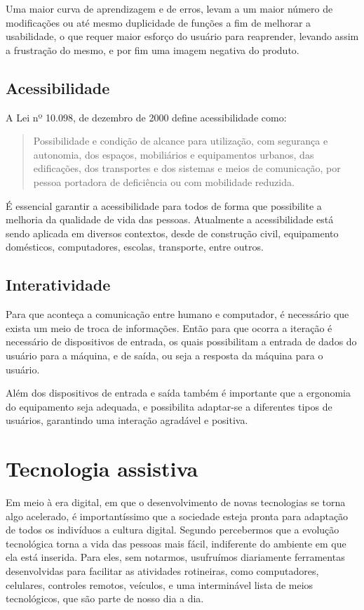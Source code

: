 \documentclass[
	12pt,			%
	openright,		%
	oneside,			%
	a4paper,			%
	chapter=TITLE,		%
	english,			%
	brazil,			%
	]{abntex2}
\begin{document}
Uma maior curva de aprendizagem e de erros, levam a um maior número de modificações ou até mesmo duplicidade de funções a fim de melhorar a usabilidade, o que requer maior esforço do usuário para reaprender, levando assim a frustração do mesmo, e por fim uma imagem negativa do produto.

\subsection{Acessibilidade}

A Lei nº 10.098, de dezembro de 2000 define acessibilidade como:

\begin{quote}\small\setlength{\leftskip}{4cm}
Possibilidade e condição de alcance para utilização, com segurança e autonomia, dos espaços, mobiliários e equipamentos urbanos, das edificações, dos transportes e dos sistemas e meios de comunicação, por pessoa portadora de deficiência ou com mobilidade reduzida.
\end{quote}

É essencial garantir a acessibilidade para todos de forma que possibilite a melhoria da qualidade de vida das pessoas. Atualmente a acessibilidade está sendo aplicada em diversos contextos, desde de construção civil, equipamento domésticos, computadores, escolas, transporte, entre outros.

\subsection{Interatividade}

Para que aconteça a comunicação entre humano e computador, é necessário que exista um meio de troca de informações. Então para que ocorra a iteração é necessário de dispositivos de entrada, os quais possibilitam a entrada de dados do usuário para a máquina, e de saída, ou seja a resposta da máquina para o usuário.

Além dos dispositivos de entrada e saída também é importante que a ergonomia do equipamento seja adequada, e possibilita adaptar-se a diferentes tipos de usuários, garantindo uma interação agradável e positiva.

\section{Tecnologia assistiva}

Em meio à era digital, em que o desenvolvimento de novas tecnologias se torna algo acelerado, é importantíssimo que a sociedade esteja pronta para adaptação de todos os indivíduos a cultura digital. Segundo  percebermos que a evolução tecnológica torna a vida das pessoas mais fácil, indiferente do ambiente em que ela está inserida. Para eles, sem notarmos, usufruímos diariamente ferramentas desenvolvidas para facilitar as atividades rotineiras, como computadores, celulares, controles remotos, veículos, e uma interminável lista de meios tecnológicos, que são parte de nosso dia a dia.
\end{document}
